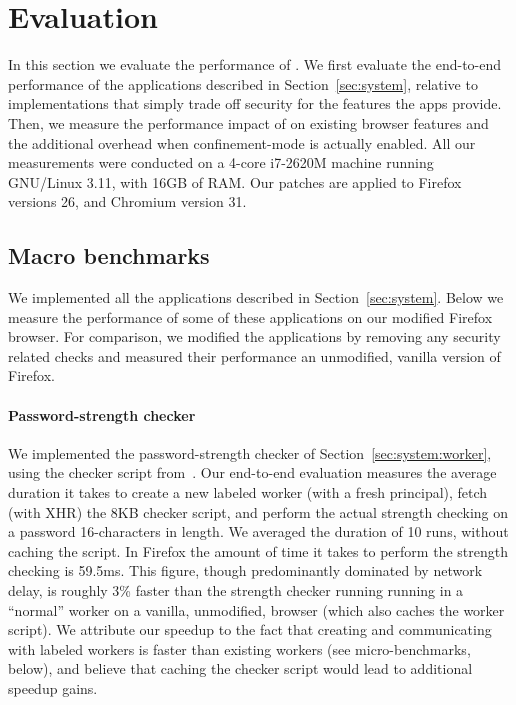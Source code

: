 \section{Evaluation}
\label{sec:eval}

In this section we evaluate the performance of \sys{}.
%
We first evaluate the end-to-end performance of the \sys{}
applications described in Section~\ref{sec:system}, relative to
implementations that simply trade off security for the features the
apps provide.
%
Then, we measure the performance impact of \sys{} on existing browser
features and the additional overhead when confinement-mode is actually
enabled.
%
All our measurements were conducted on a 4-core i7-2620M machine
running GNU/Linux 3.11, with 16GB of RAM.
%
Our patches are applied to Firefox versions 26, and Chromium version
31.
%


\subsection{Macro benchmarks}
\label{sec:eval:macro}

We implemented all the applications described in
Section~\ref{sec:system}.
%
Below we measure the performance of some of these applications on our
modified Firefox browser.
%
For comparison, we modified the applications by removing any security
related checks and measured their performance an unmodified, vanilla
version of Firefox.

\paragraph{Password-strength checker}
%
We implemented the password-strength checker of
Section~\ref{sec:system:worker}, using the checker script
from~\cite{checker1}.
%
Our end-to-end evaluation measures the average duration it takes to
create a new labeled worker (with a fresh principal), fetch (with XHR)
the 8KB checker script, and perform the actual strength
checking on a password 16-characters in length.
%
We averaged the duration of 10 runs, without caching the script.
%
In Firefox the amount of time it takes to perform the strength
checking is 59.5ms.
%
This figure, though predominantly dominated by network delay, is
roughly 3\% faster than the strength checker running running in a
``normal'' worker on a vanilla, unmodified, browser (which
also caches the worker script).
%
We attribute our speedup to the fact that creating and communicating
with labeled workers is faster than existing workers (see
micro-benchmarks, below), and believe that caching the checker script
would lead to additional speedup gains.


